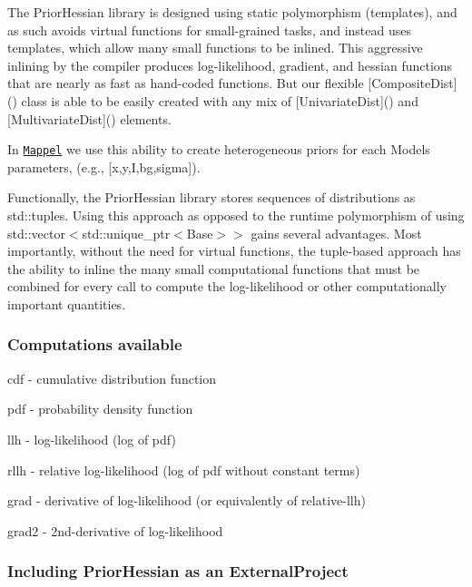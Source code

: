 The Prior\+Hessian library is designed using static polymorphism (templates), and as such avoids virtual functions for small-\/grained tasks, and instead uses templates, which allow many small functions to be inlined. This aggressive inlining by the compiler produces log-\/likelihood, gradient, and hessian functions that are nearly as fast as hand-\/coded functions. But our flexible \mbox{[}{\ttfamily Composite\+Dist}\mbox{]}() class is able to be easily created with any mix of \mbox{[}{\ttfamily Univariate\+Dist}\mbox{]}() and \mbox{[}{\ttfamily Multivariate\+Dist}\mbox{]}() elements.

In \href{https://github.com/markjolah/Mappel}{\tt Mappel} we use this ability to create heterogeneous priors for each Model\textquotesingle{}s parameters, (e.\+g., \mbox{[}x,y,I,bg,sigma\mbox{]}).

Functionally, the Prior\+Hessian library stores sequences of distributions as {\ttfamily std\+::tuples}. Using this approach as opposed to the runtime polymorphism of using {\ttfamily std\+::vector$<$std\+::unique\+\_\+ptr$<$Base$>$$>$} gains several advantages. Most importantly, without the need for virtual functions, the tuple-\/based approach has the ability to inline the many small computational functions that must be combined for every call to compute the log-\/likelihood or other computationally important quantities.

\subsubsection*{Computations available}


\begin{DoxyItemize}
\item {\ttfamily cdf} -\/ cumulative distribution function
\item {\ttfamily pdf} -\/ probability density function
\item {\ttfamily llh} -\/ log-\/likelihood (log of pdf)
\item {\ttfamily rllh} -\/ relative log-\/likelihood (log of pdf without constant terms)
\item {\ttfamily grad} -\/ derivative of log-\/likelihood (or equivalently of relative-\/llh)
\item {\ttfamily grad2} -\/ 2nd-\/derivative of log-\/likelihood
\end{DoxyItemize}

\subsubsection*{Including Prior\+Hessian as an External\+Project}